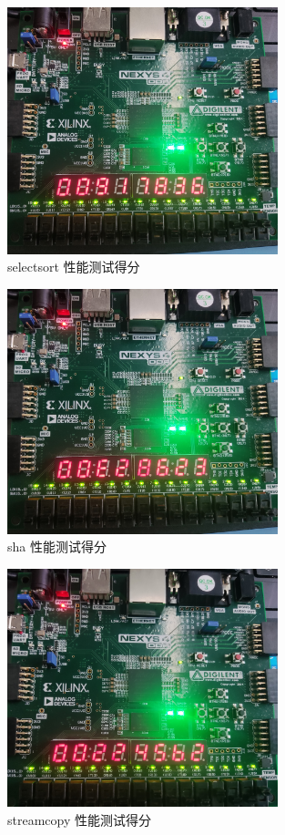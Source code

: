 \begin{figure}[htbp]
    \centering
    \includegraphics[width=0.7\textwidth]{image/per7.jpg}
    \caption{selectsort 性能测试得分}
    \label{fig:per7}
\end{figure}
\begin{figure}[htbp]
    \centering
    \includegraphics[width=0.7\textwidth]{image/per8.jpg}
    \caption{sha 性能测试得分}
    \label{fig:per8}
\end{figure}
\begin{figure}[htbp]
    \centering
    \includegraphics[width=0.7\textwidth]{image/per9.jpg}
    \caption{streamcopy 性能测试得分}
    \label{fig:per9}
\end{figure}
